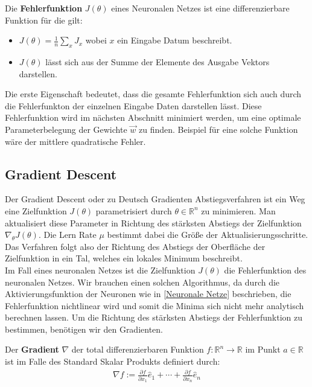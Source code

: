 \begin{definition}
    \cite[Kapitel 2]{MichaelNielsen.Juni2019}
    Die \textbf{Fehlerfunktion} $J(\theta)$ eines Neuronalen Netzes ist eine 
    differenzierbare Funktion für die gilt:
    \begin{itemize}
        \item $J(\theta) = \frac{1}{n} \sum_x J_x$ wobei $x$ ein Eingabe Datum
        beschreibt.
        \item $J(\theta)$ lässt sich aus der Summe der Elemente des Ausgabe Vektors
        darstellen.
    \end{itemize}
\end{definition}

Die erste Eigenschaft bedeutet, dass die gesamte Fehlerfunktion 
sich auch durch die Fehlerfunkton der einzelnen Eingabe Daten darstellen lässt.
Diese Fehlerfunktion wird im nächsten Abschnitt minimiert werden, um
eine optimale Parameterbelegung der Gewichte $\vec{w}$ zu finden. 
Beispiel für eine solche Funktion wäre der 
mittlere quadratische Fehler.

\subsection{Gradient Descent}\label{Gradient Descent}

Der Gradient Descent oder zu Deutsch Gradienten Abstiegsverfahren
ist ein Weg eine Zielfunktion $J(\theta)$ parametrisiert durch $\theta \in \mathbb{R}^n$
zu minimieren. Man aktualisiert diese Parameter in Richtung des stärksten Abstiegs
der Zielfunktion $\nabla_\theta J(\theta)$. Die Lern Rate $\mu$ bestimmt
dabei die Größe der Aktualisierungsschritte. Das Verfahren folgt 
also der Richtung des Abstiegs der Oberfläche der Zielfunktion in ein Tal,
welches ein lokales Minimum
beschreibt. \cite[Kapitel 1]{Ruder.9152016} \\

Im Fall eines neuronalen Netzes ist die Zielfunktion $J(\theta)$ die
Fehlerfunktion des neuronalen Netzes. 
Wir brauchen einen solchen Algorithmus, da durch die Aktivierungsfunktion der Neuronen
wie in \ref{Neuronale Netze} beschrieben, die Fehlerfunktion nichtlinear wird und somit
die Minima sich nicht mehr analytisch berechnen lassen.
Um die Richtung des stärksten Abstiegs der Fehlerfunktion zu bestimmen, benötigen
wir den Gradienten.


\begin{definition}
    \cite{Konigsberger.2002}
    Der \textbf{Gradient} $\nabla$ der total differenzierbaren Funktion
    $f:\mathbb{R}^n \rightarrow \mathbb{R}$ im Punkt $a\in\mathbb{R}$ ist im
    Falle des Standard Skalar Produkts definiert durch:
    \begin{align}
        \nabla f := \frac{\partial f}{\partial x_{1}}\hat{e}_{1}+\cdots+\frac{\partial f}{\partial x_{n}}\hat{e}_{n}
    \end{align}
\end{definition}

